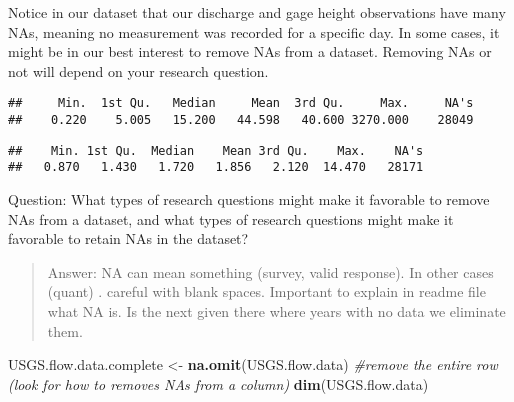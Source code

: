 \documentclass[]{article}
\newenvironment{Shaded}{\begin{snugshade}}{\end{snugshade}}
\newcommand{\KeywordTok}[1]{\textcolor[rgb]{0.13,0.29,0.53}{\textbf{#1}}}
\newcommand{\StringTok}[1]{\textcolor[rgb]{0.31,0.60,0.02}{#1}}
\newcommand{\CommentTok}[1]{\textcolor[rgb]{0.56,0.35,0.01}{\textit{#1}}}
\newcommand{\OperatorTok}[1]{\textcolor[rgb]{0.81,0.36,0.00}{\textbf{#1}}}
\newcommand{\NormalTok}[1]{#1}
\begin{document}
Notice in our dataset that our discharge and gage height observations
have many NAs, meaning no measurement was recorded for a specific day.
In some cases, it might be in our best interest to remove NAs from a
dataset. Removing NAs or not will depend on your research question.

\begin{Shaded}
\end{Shaded}

\begin{verbatim}
##     Min.  1st Qu.   Median     Mean  3rd Qu.     Max.     NA's 
##    0.220    5.005   15.200   44.598   40.600 3270.000    28049
\end{verbatim}

\begin{Shaded}
\end{Shaded}

\begin{verbatim}
##    Min. 1st Qu.  Median    Mean 3rd Qu.    Max.    NA's 
##   0.870   1.430   1.720   1.856   2.120  14.470   28171
\end{verbatim}

Question: What types of research questions might make it favorable to
remove NAs from a dataset, and what types of research questions might
make it favorable to retain NAs in the dataset?

\begin{quote}
Answer: NA can mean something (survey, valid response). In other cases
(quant) . careful with blank spaces. Important to explain in readme file
what NA is. Is the next given there where years with no data we
eliminate them.
\end{quote}

\begin{Shaded}
\begin{Highlighting}[]
\NormalTok{USGS.flow.data.complete <-}\StringTok{ }\KeywordTok{na.omit}\NormalTok{(USGS.flow.data) }\CommentTok{#remove the entire row  (look for how to removes NAs from a column)}
\KeywordTok{dim}\NormalTok{(USGS.flow.data)}
\end{Highlighting}
\end{Shaded}
\end{document}
